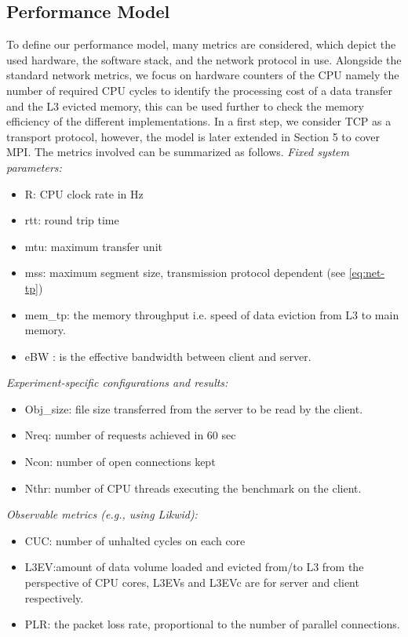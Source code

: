 \documentclass[runningheads]{llncs}
\begin{document}
\subsection{Performance Model}
To define our performance model, many metrics are considered, which depict the used hardware, the software stack, and the network protocol in use. Alongside the standard network metrics, we focus on hardware counters of the CPU namely the number of required CPU cycles to identify the processing cost of a data transfer and the L3 evicted memory, this can be used further to check the memory efficiency of the different implementations. In a first step, we consider TCP as a transport protocol, however, the model is later extended in Section 5 to cover MPI. The metrics involved can be summarized as follows.
\textit{Fixed system parameters:}
\begin{itemize}
\item R: CPU clock rate in Hz
\item rtt: round trip time
\item mtu: maximum transfer unit
\item mss: maximum segment size, transmission protocol dependent (see \cref{eq:net-tp})
\item mem\_tp: the memory throughput i.e. speed of data eviction from L3 to main memory.
\item eBW \cite{chang1995effective}: is the effective bandwidth between client and server.
\end{itemize}
\textit{Experiment-specific configurations and results:}
\begin{itemize}
\item Obj\_size: file size transferred from the server to be read by the client.
\item Nreq: number of requests achieved in 60 sec
\item Ncon: number of open connections kept
\item Nthr: number of CPU threads executing the benchmark on the client.
\end{itemize}
\textit{Observable metrics (e.g., using Likwid):}
\begin{itemize}
\item CUC: number of unhalted cycles on each core %
\item L3EV:amount of data volume loaded and evicted from/to L3 from the perspective of CPU cores\cite{l3explainedlik,intel-l3}, L3EVs and L3EVc are for server and client respectively.
\item PLR: the packet loss rate, proportional to the number of parallel connections.
\end{itemize}
\end{document}
